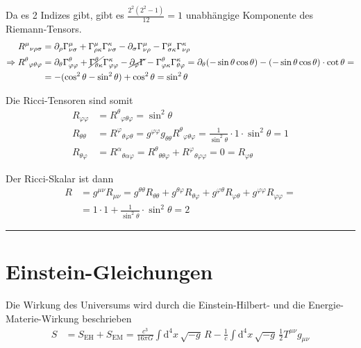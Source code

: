 \documentclass{article}
\newcommand{\diff}{\mathrm{d}}
\begin{document}
{	Da es 2 Indizes gibt, gibt es $\frac{2^2(2^2-1)}{12} = 1$ unabhängige Komponente des Riemann-Tensors.
		\begin{align*}
			R^\mu{}_{\nu\rho\sigma} &= \partial_\rho \Gamma^\mu_{\nu\sigma} + \Gamma^\mu_{\rho\kappa}\Gamma^\kappa_{\nu\sigma} - \partial_\sigma \Gamma^\mu_{\nu\rho} - \Gamma^\mu_{\sigma\kappa}\Gamma^\kappa_{\nu\rho} \\
			\Rightarrow R^\theta{}_{\varphi\theta\varphi} &= \partial_\theta \Gamma^\theta_{\varphi\varphi} + \cancel{\Gamma^\theta_{\theta\kappa}}\Gamma^\kappa_{\varphi\varphi} - \cancel{\partial_\varphi \Gamma} - \Gamma^\theta_{\varphi\kappa}\Gamma^\kappa_{\theta\varphi} = \partial_\theta (-\sin\theta\cos\theta) - (-\sin\theta\cos\theta)\cdot \cot\theta = \\
			&= -(\cos^2\theta - \sin^2\theta) + \cos^2\theta = \sin^2\theta
		\end{align*}
	
	\dotfill
	
	Die Ricci-Tensoren sind somit
		\begin{align*}
			R_{\varphi\varphi} &= R^\theta{}_{\varphi\theta\varphi} = \sin^2\theta \\
			R_{\theta\theta} &= R^\varphi{}_{\theta\varphi\theta} = g^{\varphi\varphi} g_{\theta\theta} R^\theta{}_{\varphi\theta\varphi} = \frac{1}{\sin^2\theta} \cdot 1 \cdot \sin^2\theta = 1 \\
			R_{\theta\varphi} &= R^\alpha{}_{\theta\alpha\varphi} = R^\theta{}_{\theta\theta\varphi} + R^\varphi{}_{\theta\varphi\varphi} = 0 = R_{\varphi\theta}
		\end{align*}
	
	\dotfill
	
	Der Ricci-Skalar ist dann
		\begin{align*}
			R &= g^{\mu\nu}R_{\mu\nu} = g^{\theta\theta}R_{\theta\theta} + g^{\theta\varphi}R_{\theta\varphi} + g^{\varphi\theta}R_{\varphi\theta} + g^{\varphi\varphi}R_{\varphi\varphi} = \\
			&= 1\cdot 1 + \frac{1}{\sin^2\theta} \cdot \sin^2\theta = 2
		\end{align*}
	

\hrule
}





\newpage


\section{Einstein-Gleichungen}
Die Wirkung des Universums wird durch die Einstein-Hilbert- und die Energie-Materie-Wirkung beschrieben
	\begin{align}
		S &= S_\text{EH} + S_\text{EM} = \frac{c^3}{16\pi G} \int \diff^4x\,\sqrt{-g}\, R - \frac{1}{c} \int \diff^4x\,\sqrt{-g}\, \frac{1}{2} T^{\mu\nu} g_{\mu\nu}
	\end{align}
\end{document}
